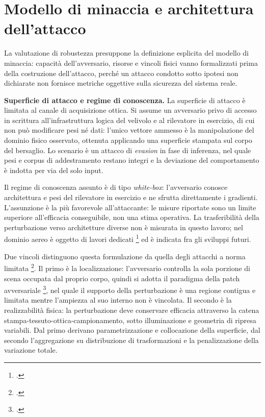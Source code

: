 \ifstampa\documentclass[a4paper,12pt,twoside,openright]{report}\else\documentclass[a4paper,12pt]{report}\fi
\newif\ifrevisione \revisionefalse
\DeclareRobustCommand{\rev}[1]{\ifrevisione{\color{blue!65!black}#1}\else#1\fi}
\newcommand{\notarev}[1]{\ifrevisione\par\medskip\noindent\fcolorbox{blue!65!black}{blue!4}{\parbox{\dimexpr\linewidth-2\fboxsep-2\fboxrule\relax}{\small\setstretch{1}\textbf{Nota per la revisione.} #1}}\par\medskip\fi}
\begin{document}
\notarev{Proposta discussa in call: lo stato è continuo, l'uscita è finita. La
figura è a blocchi stato, transizione e uscita; se preferisce, posso
sostituirla con la catena di un singolo passo.}

\section{Modello di minaccia e architettura dell'attacco}
\label{sec:attacco}

La valutazione di robustezza presuppone la definizione esplicita del modello di
minaccia: capacità dell'avversario, risorse e vincoli fisici vanno formalizzati
prima della costruzione dell'attacco, perché un attacco condotto sotto ipotesi
non dichiarate non fornisce metriche oggettive sulla sicurezza del sistema
reale.

\textbf{Superficie di attacco e regime di conoscenza.}
\label{sec:threat_model}
La superficie di attacco è limitata al canale di acquisizione ottica. Si assume
un avversario privo di accesso \rev{in scrittura} all'infrastruttura logica del
velivolo e \rev{al rilevatore in esercizio, di cui non può modificare pesi né dati}: l'unico vettore ammesso è la manipolazione del
dominio fisico osservato, ottenuta applicando una superficie stampata sul corpo
del bersaglio. Lo scenario è un attacco di \textit{evasion} in fase di
inferenza, nel quale pesi e corpus di addestramento restano integri e la
deviazione del comportamento è indotta per via del solo input.

\rev{Il regime di conoscenza assunto è di tipo \textit{white-box}: l'avversario
conosce architettura e pesi del rilevatore in esercizio e ne sfrutta
direttamente i gradienti. L'assunzione è la più favorevole all'attaccante:
le misure riportate sono un limite superiore all'efficacia conseguibile, non
una stima operativa. La trasferibilità della perturbazione verso architetture
diverse non è misurata in questo lavoro; nel dominio aereo è oggetto di lavori
dedicati \footcite{shrestha_2023} ed è indicata fra gli sviluppi futuri.}

Due vincoli distinguono questa formulazione da quella degli attacchi a norma
limitata \footcite{carlini_2017}. Il primo è la localizzazione: l'avversario
controlla la sola porzione di scena occupata dal proprio corpo, quindi si adotta
il paradigma della patch avversariale \footcite{brown_2017_patch}, nel quale il
supporto della perturbazione è una regione contigua e limitata mentre l'ampiezza
al suo interno non è vincolata. Il secondo è la realizzabilità fisica: la
perturbazione deve conservare efficacia attraverso la catena
stampa-tessuto-ottica-campionamento, sotto illuminazione e geometria di ripresa
variabili. Dal primo derivano parametrizzazione e collocazione della superficie,
dal secondo l'aggregazione su distribuzione di trasformazioni e la
penalizzazione della variazione totale.
\end{document}
